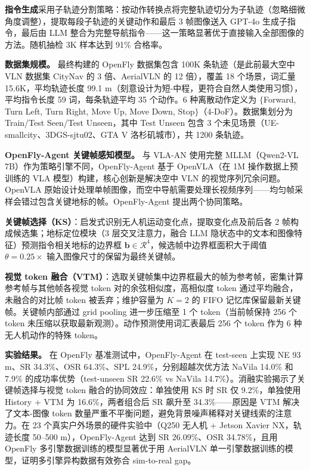 \textbf{指令生成}采用子轨迹分割策略：按动作转换点将完整轨迹切分为子轨迹（忽略细微角度调整），提取每段子轨迹的关键动作和最后 3 帧图像送入 GPT-4o 生成子指令，最后由 LLM 整合为完整导航指令——这一策略显著优于直接输入全部图像的方法。随机抽检 3K 样本达到 91\% 合格率。

\textbf{数据集规模。}
最终构建的 OpenFly 数据集包含 100K 条轨迹（是此前最大空中 VLN 数据集 CityNav 的 3 倍、AerialVLN 的 12 倍），覆盖 18 个场景，词汇量 15.6K，平均轨迹长度 99.1 m（刻意设计为短-中程，更符合自然人类使用习惯），平均指令长度 59 词，每条轨迹平均 35 个动作。6 种离散动作定义为 $\{$Forward, Turn Left, Turn Right, Move Up, Move Down, Stop$\}$（4-DoF）。数据集划分为 Train/Test Seen/Test Unseen，其中 Test Unseen 包含 3 个未见场景（UE-smallcity、3DGS-sjtu02、GTA V 洛杉矶城市），共 1200 条轨迹。

\textbf{OpenFly-Agent 关键帧感知模型。}
与 VLA-AN 使用完整 MLLM（Qwen2-VL 7B）作为策略引擎不同，OpenFly-Agent 基于 OpenVLA（在 1M 操作数据上预训练的 VLA 模型）构建，核心创新是解决空中 VLN 的视觉序列冗余问题。OpenVLA 原始设计处理单帧图像，而空中导航需要处理长视频序列——均匀帧采样会错过包含关键地标的帧。OpenFly-Agent 提出两个协同策略。

\textbf{关键帧选择（KS）}：启发式识别无人机运动变化点，提取变化点及前后各 2 帧构成候选集；地标定位模块（3 层交叉注意力，融合 LLM 隐状态中的文本和图像特征）预测指令相关地标的边界框 $\mathbf{b} \in \mathcal{R}^4$，候选帧中边界框面积大于阈值 $\theta = 0.25 \times$ 输入图像尺寸的保留为最终关键帧。

\textbf{视觉 token 融合（VTM）}：选取关键帧集中边界框最大的帧为参考帧，密集计算参考帧与其他帧各视觉 token 对的余弦相似度，高相似度 token 通过平均融合，未融合的对比帧 token 被丢弃；维护容量为 $K=2$ 的 FIFO 记忆库保留最新关键帧。关键帧内部通过 grid pooling 进一步压缩至 1 个 token（当前帧保持 256 个 token 未压缩以获取最新观测）。动作预测使用词汇表最后 256 个 token 作为 6 种无人机动作的特殊 token。

\textbf{实验结果。}
在 OpenFly 基准测试中，OpenFly-Agent 在 test-seen 上实现 NE 93 m、SR 34.3\%、OSR 64.3\%、SPL 24.9\%，分别超越次优方法 NaVila 14.0\% 和 7.9\% 的成功率优势（test-unseen SR 22.6\% vs NaVila 14.7\%）。消融实验揭示了关键帧选择与视觉 token 融合的协同效应：单独使用 KS 时 SR 仅 9.2\%，单独使用 History + VTM 为 16.6\%，两者组合后 SR 飙升至 34.3\%——原因是 VTM 解决了文本-图像 token 数量严重不平衡问题，避免背景噪声稀释对关键线索的注意力。在 23 个真实户外场景的硬件实验中（Q250 无人机 + Jetson Xavier NX，轨迹长度 50--500 m），OpenFly-Agent 达到 SR 26.09\%、OSR 34.78\%，且用 OpenFly 多引擎数据训练的模型显著优于用 AerialVLN 单一引擎数据训练的模型，证明多引擎异构数据有效弥合 sim-to-real gap。

